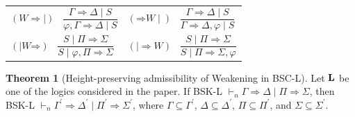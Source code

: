 \documentclass[10pt,a4paper]{article}
\theoremstyle{definition}
\newtheorem{theorem}{\textbf{Theorem}}
\newcommand{\3}{\vspace{.3in}}
\newcommand{\2}{\vspace{.2in}}
\newcommand{\1}{\vspace{.1in}}
\newcommand{\5}{\vspace{.05in}}
\begin{document}
\noindent\begin{tabular}{ll}	
	$(\mathord{W}\mathord{\Rightarrow\mid})$ \ $\dfrac{\Gamma
		\Rightarrow \Delta \mid S}{\varphi, \Gamma \Rightarrow \Delta \mid S}$ &
	$(\mathord{\Rightarrow}\mathord{W\mid})$ \ $\dfrac{\Gamma
		\Rightarrow \Delta \mid S}{\Gamma
		\Rightarrow \Delta, \varphi \mid S}$\\[16pt]
	
	$(\mathord{\mid W}\mathord{\Rightarrow})$ \ $\dfrac{S \mid \Pi\Rightarrow\Sigma}{S\mid \varphi, \Pi\Rightarrow\Sigma}$ &
	$(\mathord{\mid\Rightarrow}\mathord{W})$ \ $\dfrac{S \mid \Pi\Rightarrow\Sigma}{S \mid \Pi\Rightarrow\Sigma, \varphi}$\\[16pt]	
\end{tabular}
\begin{theorem}[Height-preserving admissibility of Weakening in BSC-L]\label{Weakening}
Let $ \bf L$ be one of the logics considered in the paper. If BSK-L $ \vdash_n \Gamma\Rightarrow\Delta\mid\Pi\Rightarrow\Sigma$, then BSK-L $ \vdash_n \Gamma^\prime\Rightarrow\Delta^\prime\mid\Pi^\prime\Rightarrow\Sigma^\prime$, where $ \Gamma\subseteq\Gamma^\prime $, $ \Delta\subseteq\Delta^\prime $, $ \Pi\subseteq\Pi^\prime $, and $ \Sigma\subseteq\Sigma^\prime $.	
\end{theorem}
\end{document}
